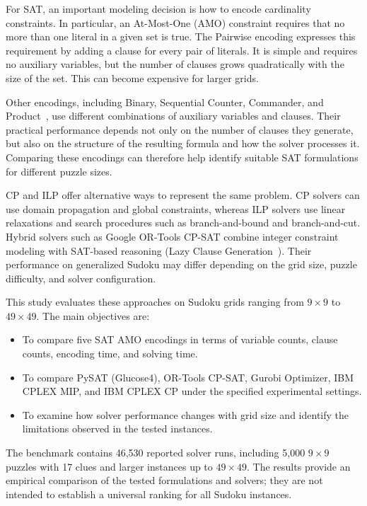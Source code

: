 \documentclass[a4paper,fleqn]{cas-sc}
\begin{document}
For SAT, an important modeling decision is how to encode cardinality constraints. In particular, an At-Most-One (AMO) constraint requires that no more than one literal in a given set is true. The Pairwise encoding expresses this requirement by adding a clause for every pair of literals. It is simple and requires no auxiliary variables, but the number of clauses grows quadratically with the size of the set. This can become expensive for larger grids.

Other encodings, including Binary, Sequential Counter, Commander, and Product~\cite{SAT_book, khanh_lecture_slides}, use different combinations of auxiliary variables and clauses. Their practical performance depends not only on the number of clauses they generate, but also on the structure of the resulting formula and how the solver processes it. Comparing these encodings can therefore help identify suitable SAT formulations for different puzzle sizes.

CP and ILP offer alternative ways to represent the same problem. CP solvers can use domain propagation and global constraints, whereas ILP solvers use linear relaxations and search procedures such as branch-and-bound and branch-and-cut. Hybrid solvers such as Google OR-Tools CP-SAT combine integer constraint modeling with SAT-based reasoning (Lazy Clause Generation~\cite{feydy2009lazy}). Their performance on generalized Sudoku may differ depending on the grid size, puzzle difficulty, and solver configuration.

This study evaluates these approaches on Sudoku grids ranging from $9 \times 9$ to $49 \times 49$. The main objectives are:

\begin{itemize}
    \item To compare five SAT AMO encodings in terms of variable counts, clause counts, encoding time, and solving time.
    \item To compare PySAT (Glucose4), OR-Tools CP-SAT, Gurobi Optimizer, IBM CPLEX MIP, and IBM CPLEX CP under the specified experimental settings.
    \item To examine how solver performance changes with grid size and identify the limitations observed in the tested instances.
\end{itemize}

The benchmark contains 46,530 reported solver runs, including 5,000 $9 \times 9$ puzzles with 17 clues and larger instances up to $49 \times 49$. The results provide an empirical comparison of the tested formulations and solvers; they are not intended to establish a universal ranking for all Sudoku instances.
\end{document}
